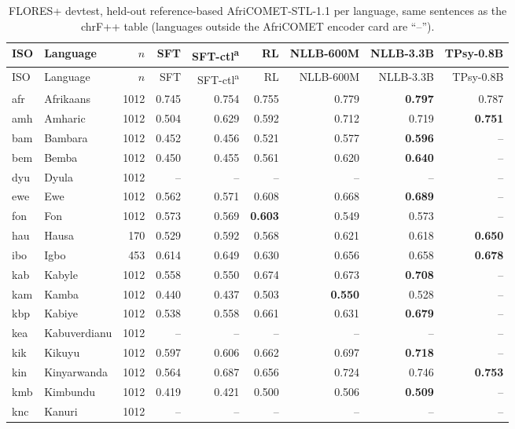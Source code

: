 {\footnotesize\setlength{\tabcolsep}{3pt}
\begin{longtable}{@{}llrrrrrrr@{}}
\caption{FLORES+ devtest, held-out reference-based AfriCOMET-STL-1.1 per language, same sentences as the chrF++ table (languages outside the AfriCOMET encoder card are ``--'').}\label{tab:full-flores-comet}\\
\toprule
ISO & Language & $n$ & SFT & SFT-ctl\textsuperscript{a} & RL & NLLB-600M & NLLB-3.3B & TPsy-0.8B \\
\midrule\endfirsthead
\toprule
ISO & Language & $n$ & SFT & SFT-ctl\textsuperscript{a} & RL & NLLB-600M & NLLB-3.3B & TPsy-0.8B \\
\midrule\endhead
\midrule\endfoot
\bottomrule\endlastfoot
afr & Afrikaans & 1012 & 0.745 & 0.754 & 0.755 & 0.779 & \textbf{0.797} & 0.787 \\
amh & Amharic & 1012 & 0.504 & 0.629 & 0.592 & 0.712 & 0.719 & \textbf{0.751} \\
bam & Bambara & 1012 & 0.452 & 0.456 & 0.521 & 0.577 & \textbf{0.596} & -- \\
bem & Bemba & 1012 & 0.450 & 0.455 & 0.561 & 0.620 & \textbf{0.640} & -- \\
dyu & Dyula & 1012 & -- & -- & -- & -- & -- & -- \\
ewe & Ewe & 1012 & 0.562 & 0.571 & 0.608 & 0.668 & \textbf{0.689} & -- \\
fon & Fon & 1012 & 0.573 & 0.569 & \textbf{0.603} & 0.549 & 0.573 & -- \\
hau & Hausa & 170 & 0.529 & 0.592 & 0.568 & 0.621 & 0.618 & \textbf{0.650} \\
ibo & Igbo & 453 & 0.614 & 0.649 & 0.630 & 0.656 & 0.658 & \textbf{0.678} \\
kab & Kabyle & 1012 & 0.558 & 0.550 & 0.674 & 0.673 & \textbf{0.708} & -- \\
kam & Kamba & 1012 & 0.440 & 0.437 & 0.503 & \textbf{0.550} & 0.528 & -- \\
kbp & Kabiye & 1012 & 0.538 & 0.558 & 0.661 & 0.631 & \textbf{0.679} & -- \\
kea & Kabuverdianu & 1012 & -- & -- & -- & -- & -- & -- \\
kik & Kikuyu & 1012 & 0.597 & 0.606 & 0.662 & 0.697 & \textbf{0.718} & -- \\
kin & Kinyarwanda & 1012 & 0.564 & 0.687 & 0.656 & 0.724 & 0.746 & \textbf{0.753} \\
kmb & Kimbundu & 1012 & 0.419 & 0.421 & 0.500 & 0.506 & \textbf{0.509} & -- \\
knc & Kanuri & 1012 & -- & -- & -- & -- & -- & -- \\

\end{longtable}}
